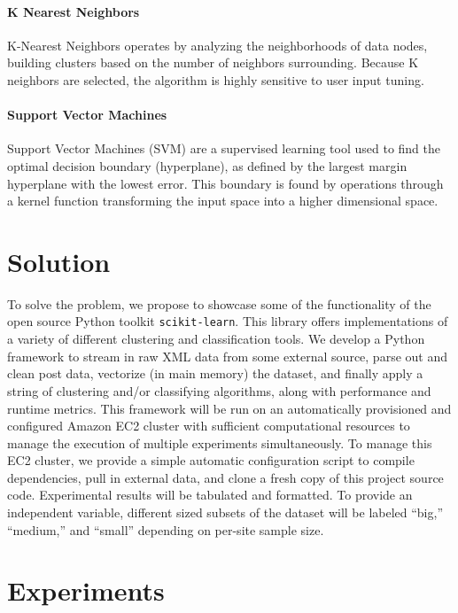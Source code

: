 \documentclass[letterpaper,10pt]{article}
\begin{document}
\paragraph{K Nearest Neighbors} K-Nearest Neighbors operates by analyzing
the neighborhoods of data nodes, building clusters based on the number of
neighbors surrounding. Because K neighbors are selected, the algorithm is
highly sensitive to user input tuning.

\paragraph{Support Vector Machines} Support Vector Machines
(SVM)\cite{vapnik1995} are a supervised learning tool used to find the
optimal decision boundary (hyperplane), as defined by the largest margin
hyperplane with the lowest error. This boundary is found by operations
through a kernel function transforming the input space into a higher
dimensional space.



\section{Solution}

To solve the problem, we propose to showcase some of the functionality of
the open source Python toolkit \texttt{scikit-learn}. This library offers
implementations of a variety of different clustering and classification
tools. We develop a Python framework to stream in raw XML data from some
external source, parse out and clean post data, vectorize (in main memory)
the dataset, and finally apply a string of clustering and/or classifying
algorithms, along with performance and runtime metrics. This framework will
be run on an automatically provisioned and configured Amazon EC2 cluster
with sufficient computational resources to manage the execution of multiple
experiments simultaneously. To manage this EC2 cluster, we provide a simple
automatic configuration script to compile dependencies, pull in external
data, and clone a fresh copy of this project source code. Experimental
results will be tabulated and formatted. To provide an independent
variable, different sized subsets of the dataset will be labeled ``big,''
``medium,'' and ``small'' depending on per-site sample size.



\section{Experiments}
\end{document}

